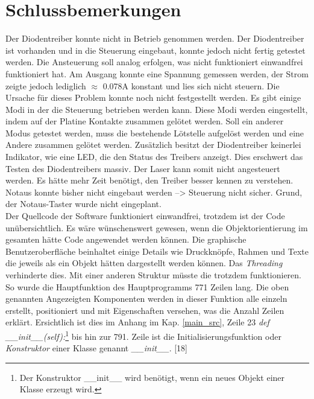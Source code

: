 \section{Schlussbemerkungen}
Der Diodentreiber konnte nicht in Betrieb genommen werden. Der Diodentreiber ist vorhanden und in die Steuerung eingebaut, konnte jedoch nicht fertig getestet werden. Die Ansteuerung soll analog erfolgen, was nicht funktioniert einwandfrei funktioniert hat. Am Ausgang konnte eine Spannung gemessen werden, der Strom zeigte jedoch lediglich $\approx$ 0.078A konstant und lies sich nicht steuern. Die Ursache für dieses Problem konnte noch nicht festgestellt werden. Es gibt einige Modi in der die Steuerung betrieben werden kann. Diese Modi werden eingestellt, indem auf der Platine Kontakte zusammen gelötet werden. Soll ein anderer Modus getestet werden, muss die bestehende Lötstelle aufgelöst werden und eine Andere zusammen gelötet werden. Zusätzlich besitzt der Diodentreiber keinerlei Indikator, wie eine LED, die den Status des Treibers anzeigt. Dies erschwert das Testen des Diodentreibers massiv. Der Laser kann somit nicht angesteuert werden. Es hätte mehr Zeit benötigt, den Treiber besser kennen zu verstehen.\\

Notaus konnte bisher nicht eingebaut werden --> Steuerung nicht sicher. Grund, der Notaus-Taster wurde nicht eingeplant.\\

Der Quellcode der Software funktioniert einwandfrei, trotzdem ist der Code unübersichtlich. Es wäre wünschenswert gewesen, wenn die Objektorientierung im gesamten hätte Code angewendet werden können. Die graphische Benutzeroberfläche beinhaltet einige Details wie Druckknöpfe, Rahmen und Texte die jeweils als ein Objekt hätten dargestellt werden können. Das \textit{Threading} verhinderte dies. Mit einer anderen Struktur müsste die trotzdem funktionieren. So wurde die Hauptfunktion des Hauptprogramms 771 Zeilen lang. Die oben genannten Angezeigten Komponenten werden in dieser Funktion alle einzeln erstellt, positioniert und mit Eigenschaften versehen, was die Anzahl Zeilen erklärt. Ersichtlich ist dies im Anhang im Kap. \ref{main_src}, Zeile 23 \textit{def \_\_init\_\_(self):}\footnote{Der Konstruktor \_\_init\_\_ wird benötigt, wenn ein neues Objekt einer Klasse erzeugt wird.} bis hin zur 791. Zeile ist die Initialisierungsfunktion oder \textit{Konstruktor} einer Klasse genannt \textit{\_\_init\_\_}. [18]\\

